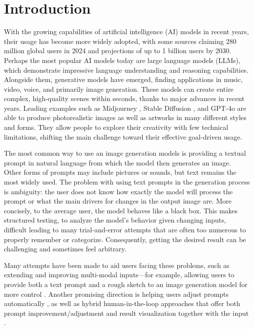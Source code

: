 \documentclass[
  a4paper,  %
  twoside,  %
  bibliography=totoc,
  headsepline,
  cleardoublepage=empty,
  parskip=half,
  draft=false
]{scrbook}
\begin{document}
%
%


\chapter{Introduction}
\label{sec:introduction}
With the growing capabilities of artificial intelligence (AI) models in recent years, their usage has become more widely adopted, with some sources claiming 280 million global users in 2024 \cite{AI-users} and projections of up to 1 billion users by 2030. Perhaps the most popular AI models today are large language models (LLMs), which demonstrate impressive language understanding and reasoning capabilities. Alongside them, generative models have emerged, finding applications in music, video, voice, and primarily image generation. These models can create entire complex, high-quality scenes within seconds, thanks to major advances in recent years. Leading examples such as Midjourney \cite{midjourney}, Stable Diffusion \cite{stable-diffusion}, and GPT-4o \cite{GPT-4o} are able to produce photorealistic images as well as artworks in many different styles and forms. They allow people to explore their creativity with few technical limitations, shifting the main challenge toward their effective goal-driven usage.

The most common way to use an image generation models is providing a textual prompt in natural language from which the model then generates an image. Other forms of prompts may include pictures or sounds, but text remains the most widely used. The problem with using text prompts in the generation process is ambiguity: the user does not know how exactly the model will process the prompt or what the main drivers for changes in the output image are. More concisely, to the average user, the model behaves like a black box. This makes structured testing, to analyze the model's behavior given changing inputs, difficult leading to many trial-and-error attempts that are often too numerous to properly remember or categorize. Consequently, getting the desired result can be challenging and sometimes feel arbitrary.

Many attempts have been made to aid users facing these problems, such as extending and improving multi-modal inputs---for example, allowing users to provide both a text prompt and a rough sketch to an image generation model for more control \cite{lin2025sketchflexfacilitatingspatialsemanticcoherence}. Another promising direction is helping users adjust prompts automatically \cite{10.1145/3729176.3729203,You2024Aesthetic}, as well as hybrid human-in-the-loop approaches that offer both prompt improvement/adjustment and result visualization together with the input \cite{PromptMagician,mishra2025promptaidpromptexplorationperturbation,brade2023promptifytexttoimagegenerationinteractive,guo2024prompthisvisualizingprocessinfluence,promptCharm}.
\end{document}
